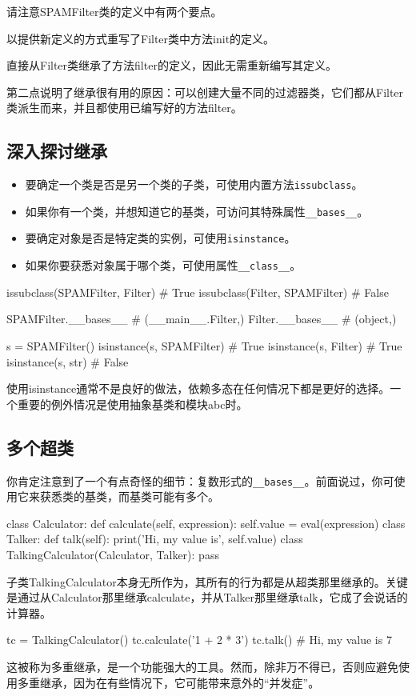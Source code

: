 请注意SPAMFilter类的定义中有两个要点。
\begin{dinglist}{43}
    \item 以提供新定义的方式重写了Filter类中方法init的定义。
    \item 直接从Filter类继承了方法filter的定义，因此无需重新编写其定义。
\end{dinglist}
第二点说明了继承很有用的原因：可以创建大量不同的过滤器类，它们都从Filter类派生而来，并且都使用已编写好的方法filter。

\subsection{深入探讨继承}
\begin{itemize}
    \item 要确定一个类是否是另一个类的子类，可使用内置方法\verb|issubclass|。
    \item 如果你有一个类，并想知道它的基类，可访问其特殊属性\verb|__bases__|。
    \item 要确定对象是否是特定类的实例，可使用\verb|isinstance|。
    \item 如果你要获悉对象属于哪个类，可使用属性\verb|__class__|。
\end{itemize}

\begin{pyc}
issubclass(SPAMFilter, Filter)  # True
issubclass(Filter, SPAMFilter)  # False

SPAMFilter.__bases__  # (__main__.Filter,)
Filter.__bases__  # (object,)

s = SPAMFilter()
isinstance(s, SPAMFilter)  # True
isinstance(s, Filter)  # True
isinstance(s, str)  # False
\end{pyc}
\begin{tcolorbox}
    使用isinstance通常不是良好的做法，依赖多态在任何情况下都是更好的选择。一个重要的例外情况是使用抽象基类和模块abc时。
\end{tcolorbox}

\subsection{多个超类}
你肯定注意到了一个有点奇怪的细节：复数形式的\verb|__bases__|。前面说过，你可使用它来获悉类的基类，而基类可能有多个。
\begin{pyc}
class Calculator:
    def calculate(self, expression):
        self.value = eval(expression)
class Talker:
    def talk(self):
        print('Hi, my value is', self.value)
class TalkingCalculator(Calculator, Talker):
    pass
\end{pyc}
子类TalkingCalculator本身无所作为，其所有的行为都是从超类那里继承的。关键是通过从Calculator那里继承calculate，并从Talker那里继承talk，它成了会说话的计算器。
\begin{pyc}
tc = TalkingCalculator()
tc.calculate('1 + 2 * 3')
tc.talk()  # Hi, my value is 7
\end{pyc}
这被称为多重继承，是一个功能强大的工具。然而，除非万不得已，否则应避免使用多重继承，因为在有些情况下，它可能带来意外的``并发症”。

